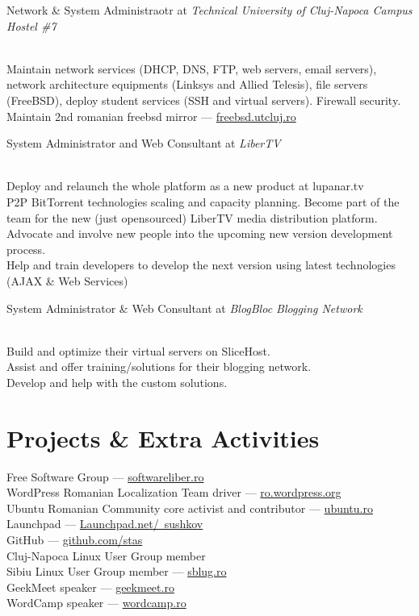 \documentclass[10pt, a4paper]{article}
\newcommand{\years}[1]{\marginnote{\scriptsize #1}}
\begin{document}
\years{2008-2009}Network \& System Administraotr at \emph{Technical University of Cluj-Napoca Campus Hostel \#7}
\begin{footnotesize}
\\
Maintain network services (DHCP, DNS, FTP, web servers, email servers), network architecture equipments (Linksys and Allied Telesis), file servers (FreeBSD), deploy student services (SSH and virtual servers). Firewall security.\\
Maintain 2nd romanian freebsd mirror --- \href{http://freebsd.utcluj.ro}{freebsd.utcluj.ro}
\end{footnotesize}

\years{2008-2009}System Administrator and Web Consultant at \emph{LiberTV}
\begin{footnotesize}
\\
Deploy and relaunch the whole platform as a new product at lupanar.tv\\
P2P BitTorrent technologies scaling and capacity planning.
Become part of the team for the new (just opensourced) LiberTV media distribution platform.\\
Advocate and involve new people into the upcoming new version development process.\\
Help and train developers to develop the next version using latest technologies (AJAX \& Web Services)
\end{footnotesize}

\years{2008}System Administrator \& Web Consultant at \emph{BlogBloc Blogging Network}
\begin{footnotesize}
\\
Build and optimize their virtual servers on SliceHost.\\
Assist and offer training/solutions for their blogging network.\\
Develop and help with the custom solutions.
\end{footnotesize}

\section*{Projects \& Extra Activities}
Free Software Group --- \href{http://softwareliber.ro}{softwareliber.ro}\\
WordPress Romanian Localization Team driver --- \href{http://ro.wordpress.org}{ro.wordpress.org}\\
Ubuntu Romanian Community core activist and contributor --- \href{http://ubuntu.ro}{ubuntu.ro}\\
Launchpad --- \href{http://launchpad.net/~sushkov}{Launchpad.net/~sushkov}\\
GitHub --- \href{http://github.com/stas/}{github.com/stas}\\
Cluj-Napoca Linux User Group member\\
Sibiu Linux User Group member --- \href{http://sblug.ro}{sblug.ro}\\
GeekMeet speaker --- \href{http://geekmeet.ro}{geekmeet.ro}\\
WordCamp speaker --- \href{http://wordcamp.ro}{wordcamp.ro}
\end{document}
